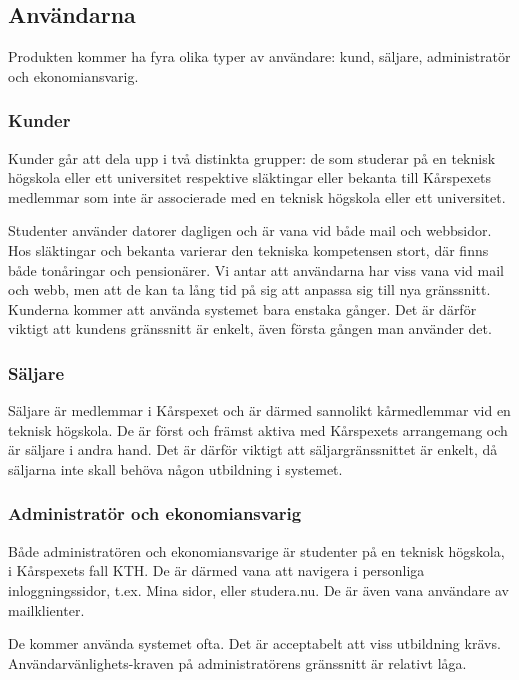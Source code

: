 \documentclass[a4paper, twoside, 11pt, titlepage]{article}
\begin{document}
	\subsection{Användarna}


	Produkten kommer ha fyra olika typer av användare: kund, säljare, administratör och ekonomiansvarig.

		\subsubsection{Kunder}


		Kunder går att dela upp i två distinkta grupper: de som studerar på en teknisk högskola eller ett universitet respektive släktingar eller bekanta till Kårspexets medlemmar som inte är associerade med en teknisk högskola eller ett universitet.

		Studenter använder datorer dagligen och är vana vid både mail och webbsidor. Hos släktingar och bekanta varierar den tekniska kompetensen stort, där finns både tonåringar och pensionärer. Vi antar att användarna har viss vana vid mail och webb, men att de kan ta lång tid på sig att anpassa sig till nya gränssnitt. Kunderna kommer att använda systemet bara enstaka gånger. Det är därför viktigt att kundens gränssnitt är enkelt, även första gången man använder det.

		\subsubsection{Säljare}


		Säljare är medlemmar i Kårspexet och är därmed sannolikt kårmedlemmar vid en teknisk högskola. De är först och främst aktiva med Kårspexets arrangemang och är säljare i andra hand. Det är därför viktigt att säljargränssnittet är enkelt, då säljarna inte skall behöva någon utbildning i systemet.

		\subsubsection{Administratör och ekonomiansvarig}


		Både administratören och ekonomiansvarige är studenter på en teknisk högskola, i Kårspexets fall KTH. De är därmed vana att navigera i personliga inloggningssidor, t.ex. Mina sidor, eller studera.nu. De är även vana användare av mailklienter.

		De kommer använda systemet ofta. Det är acceptabelt att viss utbildning krävs. Användarvänlighets-kraven på administratörens gränssnitt är relativt låga.
\end{document}
